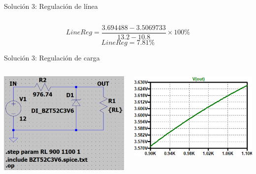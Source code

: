 \documentclass[t,aspectratio=169]{beamer}
\begin{document}
\begin{frame}{Solución 3: Regulación de línea}
\begin{columns}
\begin{column}{0.3\textwidth}
\end{column}
\end{columns}

\[ LineReg = \dfrac{3.694488 - 3.5069733}{13.2 - 10.8} \times 100\% \]
\[ LineReg = 7.81\% \]
\end{frame}


\begin{frame}{Solución 3: Regulación de carga}

\begin{columns}
\begin{column}{0.4\textwidth}
\includegraphics[width=\textwidth]{figures/loadreg_schem.png}
\end{column}
\begin{column}{0.3\textwidth}
\includegraphics[width=\textwidth]{figures/loadreg_plot.png}

\end{column}
\end{columns}
\end{frame}
\end{document}
